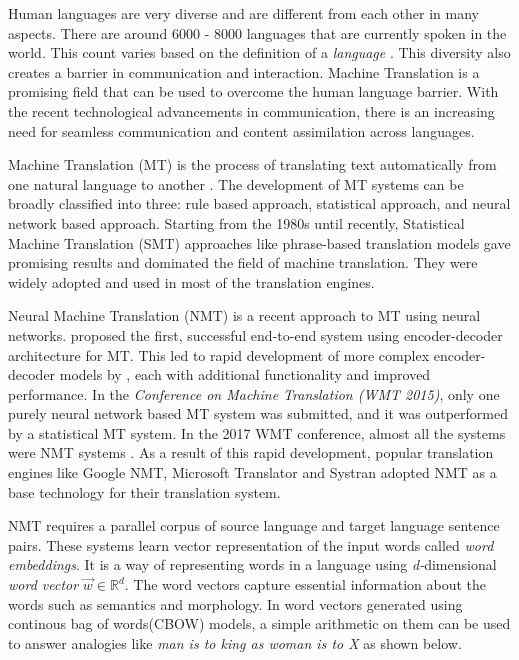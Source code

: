 
Human languages are very diverse and are different from each other in many aspects. There are around 6000 - 8000 languages that are currently spoken in the world. This count varies based on the definition of a \textit{language} \citep{evans2009myth}. This diversity also creates a barrier in communication and interaction. Machine Translation is a promising field that can be used to overcome the human language barrier. With the recent technological advancements in communication, there is an increasing need for seamless communication and content assimilation across languages. 

Machine Translation (MT) is the process of translating text automatically from one natural language to another \citep{russell2002artificial}. The development of MT systems can be broadly classified into three: rule based approach, statistical approach, and neural network based approach. Starting from the 1980s until recently, Statistical Machine Translation (SMT) approaches like phrase-based translation models \citep{och2002statistical,koehn2003statistical} gave promising results and dominated the field of machine translation. They were widely adopted and used in most of the translation engines. 


Neural Machine Translation (NMT) is a recent approach to MT using neural networks.  \cite{kalchbrenner2013recurrent} proposed the first, successful end-to-end system using encoder-decoder architecture for MT. This led to rapid development of more complex encoder-decoder models by \cite{sutskever2014sequence,cho2014learning,bahdanau2014neural,vaswani2017attention}, each with additional functionality and improved performance. In the \textit{Conference on Machine Translation (WMT 2015)}, only one purely neural network based MT system was submitted, and it was outperformed by a statistical MT system. In the 2017 WMT conference, almost all the systems were NMT systems \citep{koehn2017neural}. As a result of this rapid development, popular translation engines like Google NMT, Microsoft Translator and Systran adopted NMT as a base technology for their translation system.

NMT requires a parallel corpus of source language and target language sentence pairs. These systems 
learn vector representation of the input words called \textit{word embeddings}. It is a way of representing words in a language using \textit{d-}dimensional \textit{word vector} $\vec{w} \in \mathbb{R}^{d}$. The word vectors capture essential information about the words such as semantics and morphology. In word vectors generated using continous bag of words(CBOW) models, a simple arithmetic on them can be used to answer analogies like \textit{man is to king as woman is to X} as shown below. 

